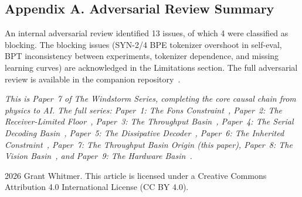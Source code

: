 \documentclass[11pt]{article}
\begin{document}
\subsection*{Appendix A. Adversarial Review Summary}

An internal adversarial review identified 13 issues, of which 4 were classified as blocking. The blocking issues (SYN-2/4 BPE tokenizer overshoot in self-eval, BPT inconsistency between experiments, tokenizer dependence, and missing learning curves) are acknowledged in the Limitations section. The full adversarial review is available in the companion repository~\cite{whitmer2026code}.

\bigskip
\noindent\emph{This is Paper~7 of The Windstorm Series, completing the core causal chain from physics to AI. The full series: Paper~1: The Fons Constraint~\cite{whitmer2026fons}, Paper~2: The Receiver-Limited Floor~\cite{whitmer2026floor}, Paper~3: The Throughput Basin~\cite{whitmer2026basin}, Paper~4: The Serial Decoding Basin~\cite{whitmer2026serial}, Paper~5: The Dissipative Decoder~\cite{whitmer2026dissipative}, Paper~6: The Inherited Constraint~\cite{whitmer2026inherited}, Paper~7: The Throughput Basin Origin (this paper), Paper~8: The Vision Basin~\cite{whitmer2026vision}, and Paper~9: The Hardware Basin~\cite{whitmer2026hardware}.}

\bigskip
\noindent\textcopyright{} 2026 Grant Whitmer. This article is licensed under a Creative Commons Attribution 4.0 International License (CC BY 4.0).
\end{document}
